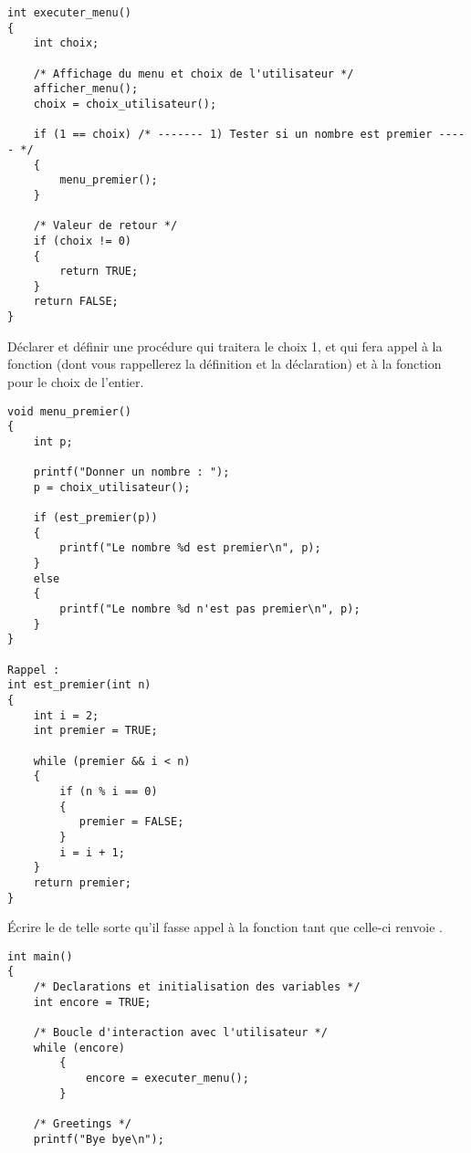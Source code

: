 \begin{lastenu}
\begin{correction}
{\footnotesize
\begin{verbatim}
int executer_menu()
{
    int choix;

    /* Affichage du menu et choix de l'utilisateur */
    afficher_menu();
    choix = choix_utilisateur();

    if (1 == choix) /* ------- 1) Tester si un nombre est premier ----- */
    {
        menu_premier(); 
    }

    /* Valeur de retour */
    if (choix != 0)
    {
        return TRUE;
    }
    return FALSE;
}
\end{verbatim}
}
  \end{correction}
\item Déclarer et définir une procédure  qui traitera
  le choix 1, et qui fera appel à la fonction 
  (dont vous rappellerez la définition et la déclaration) et à la
  fonction  pour le choix de l'entier.
  \begin{correction}
{\footnotesize
\begin{verbatim}
void menu_premier()
{
    int p;

    printf("Donner un nombre : ");
    p = choix_utilisateur();
    
    if (est_premier(p))
    {
        printf("Le nombre %d est premier\n", p);
    }
    else
    {
        printf("Le nombre %d n'est pas premier\n", p);      
    }
}

Rappel :
int est_premier(int n)
{
    int i = 2;
    int premier = TRUE;

    while (premier && i < n) 
    {   
        if (n % i == 0) 
        {
           premier = FALSE;
        }
        i = i + 1;
    }
    return premier;
}
\end{verbatim}
}
  \end{correction}
\item Écrire le  de telle sorte qu'il fasse appel à la fonction
   tant que celle-ci renvoie .


\begin{correction}
{\footnotesize
\begin{verbatim}
int main()
{
    /* Declarations et initialisation des variables */
    int encore = TRUE;
    
    /* Boucle d'interaction avec l'utilisateur */
    while (encore)
        {
            encore = executer_menu();
        }
    
    /* Greetings */
    printf("Bye bye\n");
    

\end{verbatim}}
\end{correction}
\end{lastenu}
